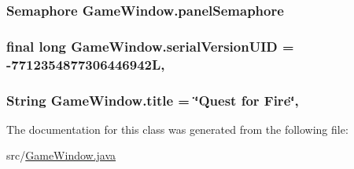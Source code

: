 \hypertarget{classGameWindow_abb7ba8d8b4b506372e17a1f5c523ca6b}{
\subsubsection[{panel\-Semaphore}]{\setlength{\rightskip}{0pt plus 5cm}Semaphore Game\-Window.\-panel\-Semaphore\hspace{0.3cm}{\ttfamily [private]}}}\label{classGameWindow_abb7ba8d8b4b506372e17a1f5c523ca6b}
\hypertarget{classGameWindow_a29133b2b32da4e6fc4c63ea6438c6050}{
\subsubsection[{serial\-Version\-U\-I\-D}]{\setlength{\rightskip}{0pt plus 5cm}final long Game\-Window.\-serial\-Version\-U\-I\-D = -\/7712354877306446942\-L\hspace{0.3cm}{\ttfamily [static]}, {\ttfamily [private]}}}\label{classGameWindow_a29133b2b32da4e6fc4c63ea6438c6050}
\hypertarget{classGameWindow_aca5fe59b0761d6873e1d7b48cd37ea8c}{
\subsubsection[{title}]{\setlength{\rightskip}{0pt plus 5cm}String Game\-Window.\-title = \char`\"{}Quest for Fire\char`\"{}\hspace{0.3cm}{\ttfamily [static]}, {\ttfamily [private]}}}\label{classGameWindow_aca5fe59b0761d6873e1d7b48cd37ea8c}


The documentation for this class was generated from the following file\-:\begin{DoxyCompactItemize}
\item 
src/\hyperlink{GameWindow_8java}{Game\-Window.\-java}\end{DoxyCompactItemize}
